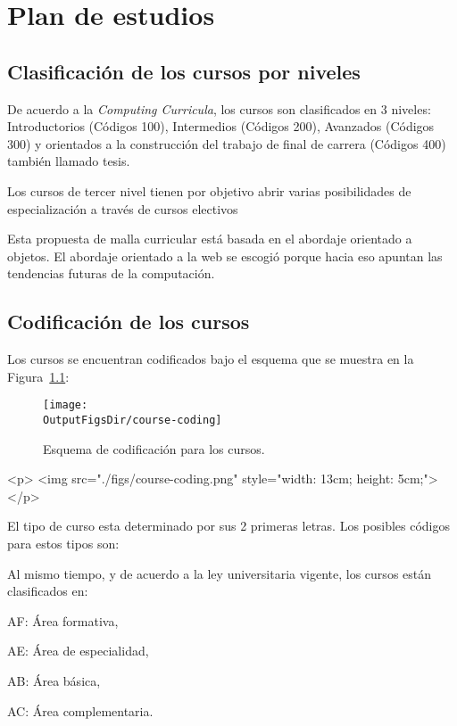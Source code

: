 \chapter{Plan de estudios \YYYY}\label{chap:GeneralInfo}

\section{Clasificación de los cursos por niveles}
De acuerdo a la \textit{Computing Curricula}, los cursos son clasificados en 3 niveles: Introductorios (Códigos 100), 
Intermedios  (Códigos 200), Avanzados  (Códigos 300) y orientados a la construcción del trabajo de final de carrera  (Códigos 400) también llamado tesis.

Los cursos de tercer nivel tienen por objetivo abrir varias posibilidades de especialización a través de cursos electivos

Esta propuesta de malla curricular está basada en el abordaje orientado a objetos. 
El abordaje orientado a la web se escogió porque hacia eso apuntan las tendencias 
futuras de la computación.

\section{Codificación de los cursos}
Los cursos se encuentran codificados bajo el esquema que se muestra en la Figura~\ref{fig:course-number}:

\begin{latexonly}
      \begin{figure}[ht]
      \centering
      \texttt{[image: \\OutputFigsDir/course-coding]}
      \caption{Esquema de codificación para los cursos.}
      \label{fig:course-number}
      \end{figure}
\end{latexonly}
\begin{htmlonly}
      \begin{rawhtml}
            <p>
                  <img src="./figs/course-coding.png" style="width: 13cm; height: 5cm;">
            </p>
      \end{rawhtml}
\end{htmlonly}

El tipo de curso esta determinado por sus 2 primeras letras. Los posibles códigos para estos tipos son:


Al mismo tiempo, y de acuerdo a la ley universitaria vigente, los cursos están clasificados en:
\begin{inparadesc}
\item [AF:] Área formativa,
\item [AE:] Área de especialidad,
\item [AB:] Área básica,
\item [AC:] Área complementaria.
\end{inparadesc}


